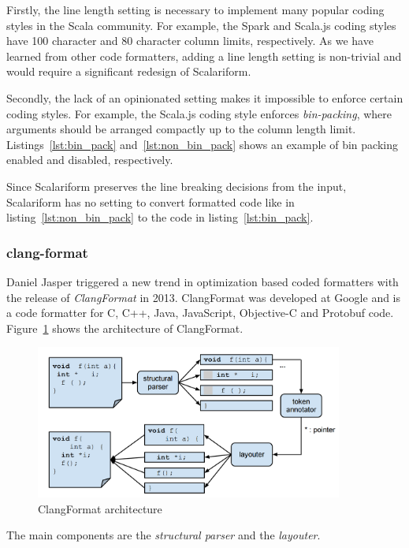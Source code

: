 Firstly, the line length setting is necessary to implement many popular coding styles in the Scala community.
For example, the Spark\autocite{xin_spark_2015} and Scala.js\autocite{doeraene_scala.js_2015} coding styles have 100 character and 80 character column limits, respectively.
As we have learned from other code formatters, adding a line length setting is non-trivial and would require a significant redesign of Scalariform.

Secondly, the lack of an opinionated setting makes it impossible to enforce certain coding styles.
For example, the Scala.js coding style enforces \emph{bin-packing}, where arguments should be arranged compactly up to the column length limit.
Listings~\ref{lst:bin_pack} and~\ref{lst:non_bin_pack} shows an example of bin packing enabled and disabled, respectively.

\begin{minipage}{.45\textwidth}
  
\end{minipage}
\hfil
\begin{minipage}{.45\textwidth}
  
\end{minipage}

Since Scalariform preserves the line breaking decisions from the input,
Scalariform has no setting to convert formatted code like in listing~\ref{lst:non_bin_pack} to the code in listing~\ref{lst:bin_pack}.

\subsubsection{clang-format}
Daniel Jasper triggered a new trend in optimization based coded formatters with the release of \emph{ClangFormat}\autocite{jasper_clang-format_2014} in 2013.
ClangFormat was developed at Google and is a code formatter for C, C++, Java, JavaScript, Objective-C and Protobuf code.
Figure~\ref{fig:clang_format} shows the architecture of ClangFormat.
\begin{figure}
  \centering
  \includegraphics[width=0.9\textwidth]{img/clang-format.png}
  \caption{ClangFormat architecture}
  \label{fig:clang_format}
\end{figure}
The main components are the \emph{structural parser} and the \emph{layouter}.


